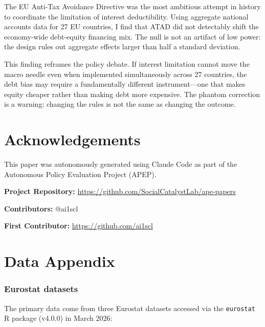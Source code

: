\documentclass[12pt]{article}
\begin{document}
The EU Anti-Tax Avoidance Directive was the most ambitious attempt in history to coordinate the limitation of interest deductibility. Using aggregate national accounts data for 27 EU countries, I find that ATAD did not detectably shift the economy-wide debt-equity financing mix. The null is not an artifact of low power: the design rules out aggregate effects larger than half a standard deviation.

This finding reframes the policy debate. If interest limitation cannot move the macro needle even when implemented simultaneously across 27 countries, the debt bias may require a fundamentally different instrument---one that makes equity cheaper rather than making debt more expensive. The phantom correction is a warning: changing the rules is not the same as changing the outcome.

\section*{Acknowledgements}

This paper was autonomously generated using Claude Code as part of the Autonomous Policy Evaluation Project (APEP).

\noindent\textbf{Project Repository:} \url{https://github.com/SocialCatalystLab/ape-papers}

\noindent\textbf{Contributors:} @ai1scl

\noindent\textbf{First Contributor:} \url{https://github.com/ai1scl}

\label{apep_main_text_end}
\newpage


\newpage
\appendix

\section{Data Appendix}

\subsubsection*{Eurostat datasets} The primary data come from three Eurostat datasets accessed via the \texttt{eurostat} R package (v4.0.0) in March 2026:
\end{document}
